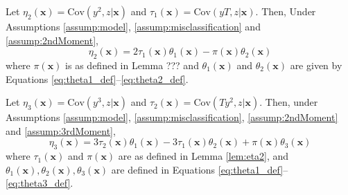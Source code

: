 
\begin{lem}
  Let $\eta_2(\mathbf{x}) = \mbox{Cov}(y^2,z|\mathbf{x})$ and $\tau_1(\mathbf{x}) = \mbox{Cov}(yT,z|\mathbf{x})$.
Then, Under Assumptions \ref{assump:model}, \ref{assump:misclassification} and \ref{assump:2ndMoment}, 
\[
    \eta_2(\mathbf{x}) =  2\tau_1(\mathbf{x}) \theta_1(\mathbf{x}) - \pi(\mathbf{x})\theta_2(\mathbf{x})
\]
where $\pi(\mathbf{x})$ is as defined in Lemma ??? and $\theta_1(\mathbf{x})$ and $\theta_2(\mathbf{x})$ are given by Equations \ref{eq:theta1_def}--\ref{eq:theta2_def}.
  \label{lem:eta2}
\end{lem}

 


\begin{lem}
  Let $\eta_3(\mathbf{x}) = \mbox{Cov}(y^3,z|\mathbf{x})$ and $\tau_2(\mathbf{x}) = \mbox{Cov}(Ty^2,z|\mathbf{x})$.
  Then, under Assumptions \ref{assump:model}, \ref{assump:misclassification}, \ref{assump:2ndMoment} and \ref{assump:3rdMoment},
\[
  \eta_3(\mathbf{x}) =  3\tau_2(\mathbf{x}) \theta_1(\mathbf{x}) - 3\tau_1(\mathbf{x}) \theta_2(\mathbf{x}) + \pi(\mathbf{x})\theta_3(\mathbf{x})
\]
where $\tau_1(\mathbf{x})$ and $\pi(\mathbf{x})$ are as defined in Lemma \ref{lem:eta2}, and $\theta_1(\mathbf{x}), \theta_2(\mathbf{x}), \theta_3(\mathbf{x})$ are defined in Equations \ref{eq:theta1_def}--\ref{eq:theta3_def}.
  \label{lem:eta3}
\end{lem}



